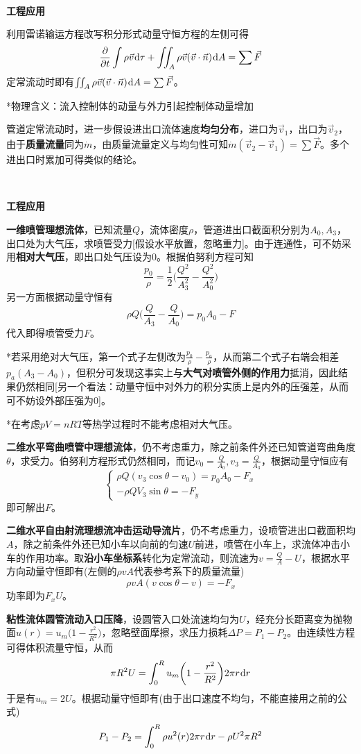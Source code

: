 \documentclass[a4paper,UTF8,fontset=windows]{ctexart}
\newcommand*{\dr}{\hspace{0.07em}\mathrm{d}}
\begin{document}
\

\textbf{工程应用}

利用雷诺输运方程改写积分形式动量守恒方程的左侧可得
$$\frac{\partial}{\partial t}\int\rho\vec{v}\dr\tau+\iint_A\rho\vec{v}(\vec{v}\cdot\vec{n})\dr A=\sum\vec{F}$$
定常流动时即有$\iint_A\rho\vec{v}(\vec{v}\cdot\vec{n})\dr A=\sum\vec{F}$。

*物理含义：流入控制体的动量与外力引起控制体动量增加

管道定常流动时，进一步假设进出口流体速度\textbf{均匀分布}，进口为$\vec{v}_1$，出口为$\vec{v}_2$，由于\textbf{质量流量}同为$\dot{m}$，由质量流量定义与均匀性可知$\dot{m}(\vec{v}_2-\vec{v}_1)=\sum\vec{F}$。多个进出口时累加可得类似的结论。

\

\textbf{工程应用}

\textbf{一维喷管理想流体}，已知流量$Q$，流体密度$\rho$，管道进出口截面积分别为$A_0,A_3$，出口处为大气压，求喷管受力[假设水平放置，忽略重力]。由于连通性，可不妨采用\textbf{相对大气压}，即出口处气压设为0。根据伯努利方程可知
$$\frac{p_0}{\rho}=\frac{1}{2}\bigg(\frac{Q^2}{A_3^2}-\frac{Q^2}{A_0^2}\bigg)$$
另一方面根据动量守恒有
$$\rho Q\bigg(\frac{Q}{A_3}-\frac{Q}{A_0}\bigg)=p_0A_0-F$$
代入即得喷管受力$F$。

*若采用绝对大气压，第一个式子左侧改为$\frac{p_0}{\rho}-\frac{p_a}{\rho}$，从而第二个式子右端会相差$p_a(A_3-A_0)$，但积分可发现这事实上与\textbf{大气对喷管外侧的作用力}抵消，因此结果仍然相同[另一个看法：动量守恒中对外力的积分实质上是内外的压强差，从而可不妨设外部压强为0]。

*在考虑$pV=nRT$等热学过程时不能考虑相对大气压。

\textbf{二维水平弯曲喷管中理想流体}，仍不考虑重力，除之前条件外还已知管道弯曲角度$\theta$，求受力。伯努利方程形式仍然相同，而记$v_0=\frac{Q}{A_0},v_3=\frac{Q}{A_3}$，根据动量守恒应有
$$\begin{cases}\rho Q(v_3\cos\theta-v_0)=p_0A_0-F_x\\-\rho QV_3\sin\theta=-F_y\end{cases}$$
即可解出$F$。

\textbf{二维水平自由射流理想流冲击运动导流片}，仍不考虑重力，设喷管进出口截面积均$A$，除之前条件外还已知小车以向前的匀速$U$前进，喷管在小车上，求流体冲击小车的作用功率。取\textbf{沿小车坐标系}转化为定常流动，则流速为$v=\frac{Q}{A}-U$，根据水平方向动量守恒即有(左侧的$\rho vA$代表参考系下的质量流量)
$$\rho vA(v\cos\theta-v)=-F_x$$
功率即为$F_xU$。

\textbf{粘性流体圆管流动入口压降}，设圆管入口处流速均匀为$U$，经充分长距离变为抛物面$u(r)=u_m\big(1-\frac{r^2}{R^2}\big)$，忽略壁面摩擦，求压力损耗$\Delta P=P_1-P_2$。由连续性方程可得体积流量守恒，从而
$$\pi R^2U=\int_0^Ru_m\bigg(1-\frac{r^2}{R^2}\bigg)2\pi r\dr r$$
于是有$u_m=2U$。根据动量守恒即有(由于出口速度不均匀，不能直接用之前的公式)
$$P_1-P_2=\int_0^R\rho u^2(r)2\pi r\dr r-\rho U^2\pi R^2$$
\end{document}
